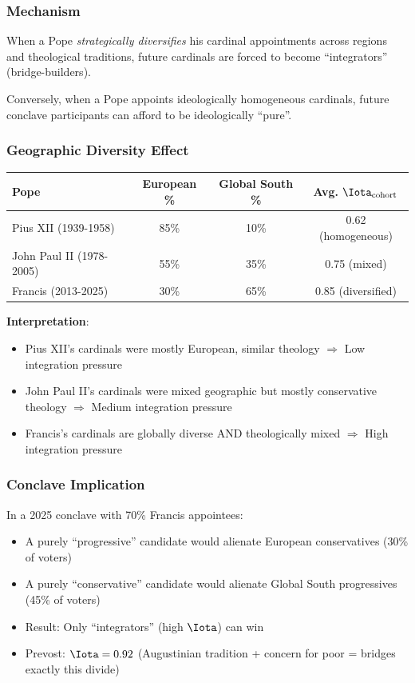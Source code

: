 \documentclass[11pt]{article}
\begin{document}
\subsubsection{Mechanism}

When a Pope \textit{strategically diversifies} his cardinal appointments across regions and theological traditions, future cardinals are forced to become ``integrators'' (bridge-builders).

Conversely, when a Pope appoints ideologically homogeneous cardinals, future conclave participants can afford to be ideologically ``pure''.

\subsubsection{Geographic Diversity Effect}

\begin{table}[h]
\centering
\begin{tabular}{|l|c|c|c|}
\hline
\textbf{Pope} & \textbf{European \%} & \textbf{Global South \%} & \textbf{Avg. } $\Iota_{\text{cohort}}$ \\
\hline
Pius XII (1939-1958) & 85\% & 10\% & 0.62 (homogeneous) \\
John Paul II (1978-2005) & 55\% & 35\% & 0.75 (mixed) \\
Francis (2013-2025) & 30\% & 65\% & 0.85 (diversified) \\
\hline
\end{tabular}
\end{table}

\textbf{Interpretation}:
\begin{itemize}
\item Pius XII's cardinals were mostly European, similar theology $\Rightarrow$ Low integration pressure
\item John Paul II's cardinals were mixed geographic but mostly conservative theology $\Rightarrow$ Medium integration pressure
\item Francis's cardinals are globally diverse AND theologically mixed $\Rightarrow$ High integration pressure
\end{itemize}

\subsubsection{Conclave Implication}

In a 2025 conclave with 70\% Francis appointees:
\begin{itemize}
\item A purely ``progressive'' candidate would alienate European conservatives (30\% of voters)
\item A purely ``conservative'' candidate would alienate Global South progressives (45\% of voters)
\item Result: Only ``integrators'' (high $\Iota$) can win
\item Prevost: $\Iota = 0.92$ (Augustinian tradition + concern for poor = bridges exactly this divide)
\end{itemize}
\end{document}
